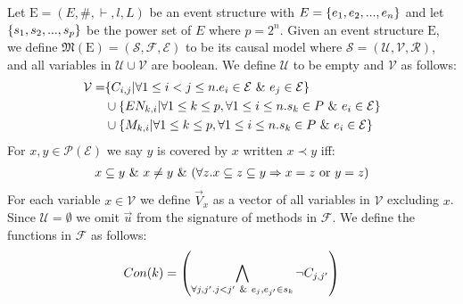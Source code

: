 Let $\mathrm{E} = (E,\#,\vdash,l,L)$ be an event structure with
$E = \{e_1, e_2, ...,e_n\}$ and let $\{s_1,s_2,...,s_p\}$ be the power set of $E$ where $p = 2^n$.
Given an event structure $\mathrm{E}$, we define
$\mathfrak{M}(\mathrm{E}) = (\mathcal{S},\mathcal{F},\mathcal{E})$
to be its causal model where
$\mathcal{S} = (\mathcal{U},\mathcal{V},\mathcal{R})$, and all variables in
$\mathcal{U} \cup \mathcal{V}$ are boolean.
We define $\mathcal{U}$ to be empty and $\mathcal{V}$ as follows:
\begin{align*}
    \mathcal{V} = & \{C_{i,j} | \forall 1 \leq i < j \leq n. e_i \in \mathcal{E} \ \& \  e_j \in \mathcal{E}\}                     \\
                  & \cup \{EN_{k,i} | \forall 1 \leq k \leq p , \forall 1 \leq i \leq n . s_k \in P \ \& \  e_i \in \mathcal{E} \} \\
                  & \cup \{M_{k,i} | \forall 1 \leq k \leq p , \forall 1 \leq i \leq n . s_k \in P \ \& \  e_i \in \mathcal{E} \}
\end{align*}
For $x,y \in \mathcal{P}(\mathcal{E})$ we say $y$ is covered by $x$ written $ x \prec y$ iff:
\begin{align*}
    x \subseteq y \ \& \  x \neq y \ \& \ 
    (\forall z. x \subseteq z \subseteq y \Rightarrow x = z
    \text{ or } y = z)
\end{align*}
For each variable $x \in \mathcal{V}$ we define $\vec V_x$ as a vector
of all variables in $\mathcal{V}$ excluding $x$.
Since $\mathcal{U} = \emptyset$ we omit $\vec u$ from the
signature of methods in $\mathcal{F}$.
We define the functions in $\mathcal{F}$ as follows:
\begin{align*}
    Con(k) & =   \left(
    \bigwedge_{\forall j,j'. j<j' \ \& \  e_j,e_{j'} \in s_k}
    \neg C_{j,j'}
    \right)             \\
\end{align*}
